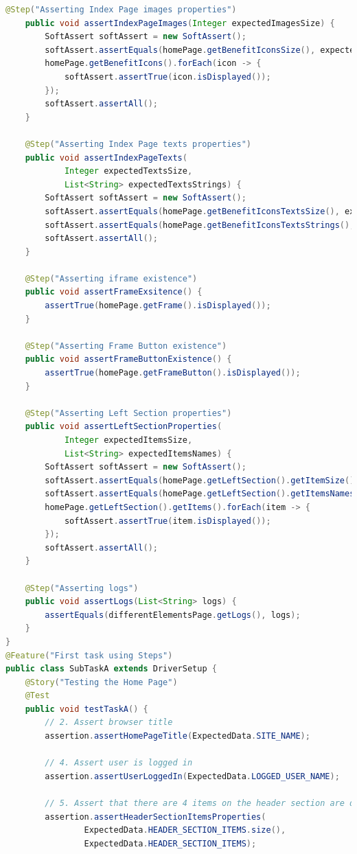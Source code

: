\documentclass[a4paper]{article}
\begin{document}
\begin{lstlisting}[language=Java]
    @Step("Asserting Index Page images properties")
    public void assertIndexPageImages(Integer expectedImagesSize) {
        SoftAssert softAssert = new SoftAssert();
        softAssert.assertEquals(homePage.getBenefitIconsSize(), expectedImagesSize);
        homePage.getBenefitIcons().forEach(icon -> {
            softAssert.assertTrue(icon.isDisplayed());
        });
        softAssert.assertAll();
    }

    @Step("Asserting Index Page texts properties")
    public void assertIndexPageTexts(
            Integer expectedTextsSize,
            List<String> expectedTextsStrings) {
        SoftAssert softAssert = new SoftAssert();
        softAssert.assertEquals(homePage.getBenefitIconsTextsSize(), expectedTextsSize);
        softAssert.assertEquals(homePage.getBenefitIconsTextsStrings(), expectedTextsStrings);
        softAssert.assertAll();
    }

    @Step("Asserting iframe existence")
    public void assertFrameExsitence() {
        assertTrue(homePage.getFrame().isDisplayed());
    }

    @Step("Asserting Frame Button existence")
    public void assertFrameButtonExistence() {
        assertTrue(homePage.getFrameButton().isDisplayed());
    }

    @Step("Asserting Left Section properties")
    public void assertLeftSectionProperties(
            Integer expectedItemsSize,
            List<String> expectedItemsNames) {
        SoftAssert softAssert = new SoftAssert();
        softAssert.assertEquals(homePage.getLeftSection().getItemSize(), expectedItemsSize);
        softAssert.assertEquals(homePage.getLeftSection().getItemsNames(), expectedItemsNames);
        homePage.getLeftSection().getItems().forEach(item -> {
            softAssert.assertTrue(item.isDisplayed());
        });
        softAssert.assertAll();
    }

    @Step("Asserting logs")
    public void assertLogs(List<String> logs) {
        assertEquals(differentElementsPage.getLogs(), logs);
    }
}
@Feature("First task using Steps")
public class SubTaskA extends DriverSetup {
    @Story("Testing the Home Page")
    @Test
    public void testTaskA() {
        // 2. Assert browser title
        assertion.assertHomePageTitle(ExpectedData.SITE_NAME);

        // 4. Assert user is logged in
        assertion.assertUserLoggedIn(ExpectedData.LOGGED_USER_NAME);

        // 5. Assert that there are 4 items on the header section are displayed, and they have proper texts
        assertion.assertHeaderSectionItemsProperties(
                ExpectedData.HEADER_SECTION_ITEMS.size(),
                ExpectedData.HEADER_SECTION_ITEMS);


\end{lstlisting}
\end{document}
